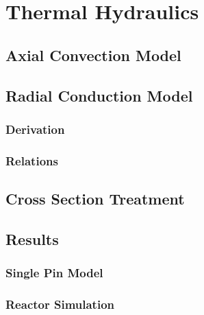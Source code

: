 \chapter{Thermal Hydraulics}
\label{ch:thermalHydraulics}

\section{Axial Convection Model}
\section{Radial Conduction Model}
  \subsection{Derivation}
  \subsection{Relations}
\section{Cross Section Treatment}
\section{Results}
  \subsection{Single Pin Model}
  \subsection{Reactor Simulation}
